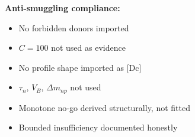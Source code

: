 \begin{resultbox}[title=N7 WP2 Summary]
\textbf{Anti-smuggling compliance:}
\begin{itemize}
    \item[$\checkmark$] No forbidden donors imported
    \item[$\checkmark$] $C = 100$ not used as evidence
    \item[$\checkmark$] No profile shape imported as [Dc]
    \item[$\checkmark$] $\tau_n$, $V_B$, $\Delta m_{np}$ not used
    \item[$\checkmark$] Monotone no-go derived structurally, not fitted
    \item[$\checkmark$] Bounded insufficiency documented honestly
\end{itemize}
\end{resultbox}
